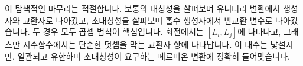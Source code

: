 \begin{classroomqa}
\end{classroomqa}

이 탐색적인 마무리는 적절합니다. 보통의 대칭성을 살펴보며 유니터리 변환에서 생성자와 교환자로 나아갔고, 초대칭성을 살펴보며 홀수 생성자에서 반교환 변수로 나아갔습니다. 두 경우 모두 곱셈 법칙이 핵심입니다. 회전에서는 \([L_i,L_j]\)에 나타나고, 그래스만 지수함수에서는 단순한 덧셈을 막는 교환자 항에 나타납니다. 이 대수는 낯설지만, 일관되고 유한하며 초대칭성이 요구하는 페르미온 변환에 정확히 들어맞습니다.
